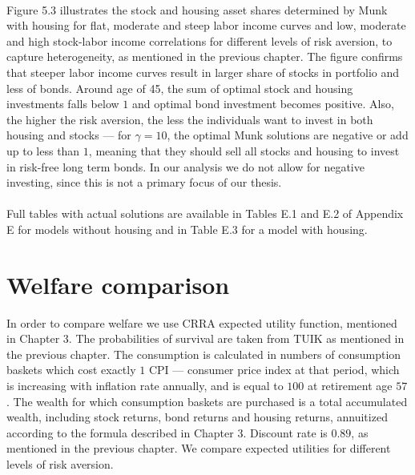 \documentclass[]{elsarticle}
\begin{document}
\paragraph{}Figure 5.3 illustrates the stock and housing asset shares determined by Munk with housing for flat, moderate and steep labor income curves and low, moderate and high stock-labor income correlations for different levels of risk aversion, to capture heterogeneity, as mentioned in the previous chapter. The figure confirms that steeper labor income curves result in larger share of stocks in portfolio and less of bonds. Around age of 45, the sum of optimal stock and housing investments falls below $1$ and optimal bond investment becomes positive. Also, the higher the risk aversion, the less the individuals want to invest in both housing and stocks --- for $\gamma=10$, the optimal Munk solutions are negative or add up to less than $1$, meaning that they should sell all stocks and housing to invest in risk-free long term bonds. In our analysis we do not allow for negative investing, since this is not a primary focus of our thesis.  



\paragraph{}Full tables with actual solutions are available in Tables E.1 and E.2 of Appendix E for models without housing and in Table E.3 for a model with housing. 

\section{Welfare comparison}
\label{welfare}

In order to compare welfare we use CRRA expected utility function, mentioned in Chapter 3. The probabilities of survival are taken from TUIK as mentioned in the previous chapter. The consumption is calculated in numbers of consumption baskets which cost exactly $1$ CPI --- consumer price index at that period, which is increasing with inflation rate annually, and is equal to $100$ at retirement age $57$. The wealth for which consumption baskets are purchased is a total accumulated wealth, including stock returns, bond returns and housing returns, annuitized according to the formula described in Chapter 3. Discount rate is $0.89$, as mentioned in the previous chapter. We compare expected utilities for different levels of risk aversion.
\end{document}
